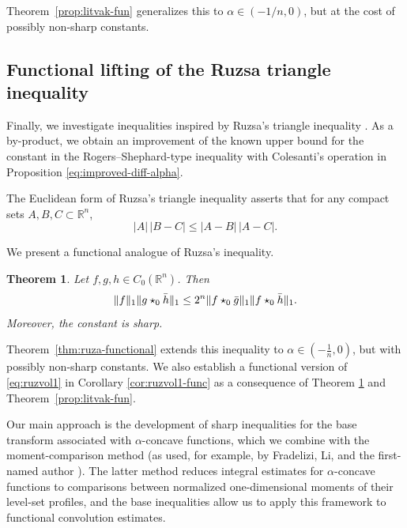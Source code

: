 \documentclass[11pt]{amsart}
\newcommand{\R}{{\mathbb R}}
\theoremstyle{plain}
\newtheorem{theorem}{Theorem}[section]
\theoremstyle{definition}
\theoremstyle{remark}
\begin{document}
Theorem~\ref{prop:litvak-fun} generalizes this to $\alpha\in (-1/n,0)$, but at the cost of possibly non-sharp constants.

\subsection{Functional lifting of the Ruzsa triangle inequality}

Finally, we investigate inequalities inspired by Ruzsa's triangle inequality \cite{R-96}. As a by-product, we obtain an improvement of the known upper bound for the constant in the Rogers--Shephard-type inequality with Colesanti’s operation in Proposition \ref{eq:improved-diff-alpha}.

The Euclidean form of Ruzsa's triangle inequality asserts that for any compact sets \(A,B,C\subset \mathbb{R}^n\),
\begin{equation}
\label{eq:Ruzsa-ineq-wo-A}
|A|\,|B-C| \le |A-B|\,|A-C|.
\end{equation}

We present a functional analogue of Ruzsa's inequality. 


\begin{theorem} \label{thm: Ruza-triangle-fun}
    Let $f,g,h \in C_0 (\R^n)$. Then
    \[
        \|f\|_1 \|g \star_0 \Bar h\|_1 \leq 2^n \|f \star_0 \Bar g \|_1 \|f \star_0 \Bar h \|_1.
    \]
    Moreover, the constant is sharp.
\end{theorem}

Theorem~\ref{thm:ruza-functional} extends this inequality to $\alpha\in (-\frac{1}{n},0)$, but with possibly non-sharp constants. We also establish a functional version of \eqref{eq:ruzvol1} in Corollary \ref{cor:ruzvol1-func} as a consequence of Theorem \ref{thm: Ruza-triangle-fun} and Theorem~\ref{prop:litvak-fun}.


\par\vspace{.2in}
Our main approach is the development of sharp inequalities for the base transform associated with $\alpha$-concave functions, which we combine with the moment-comparison method (as used, for example, by Fradelizi, Li, and the first-named author \cite{FLM-20}). The latter method reduces integral estimates for $\alpha$-concave functions to comparisons between normalized one-dimensional moments of their level-set profiles, and the base inequalities allow us to apply this framework to functional convolution estimates.
\end{document}
